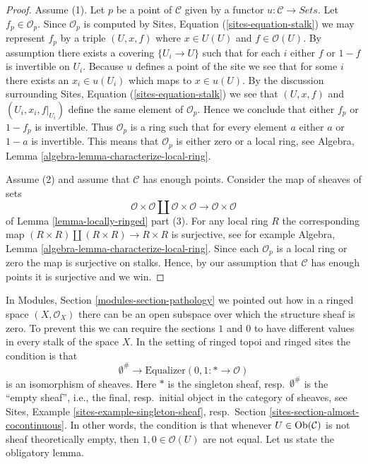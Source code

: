 \begin{proof}
Assume (1). Let $p$ be a point of $\mathcal{C}$ given by a functor
$u : \mathcal{C} \to \textit{Sets}$. Let
$f_p \in \mathcal{O}_p$. Since $\mathcal{O}_p$ is computed by
Sites, Equation (\ref{sites-equation-stalk})
we may represent $f_p$ by a triple
$(U, x, f)$ where $x \in U(U)$ and $f \in \mathcal{O}(U)$.
By assumption there exists a covering $\{U_i \to U\}$
such that for each $i$ either $f$ or $1 - f$ is invertible
on $U_i$. Because $u$ defines a point of the site we see that
for some $i$ there exists an $x_i \in u(U_i)$ which maps to
$x \in u(U)$. By the discussion surrounding
Sites, Equation (\ref{sites-equation-stalk})
we see that $(U, x, f)$ and $(U_i, x_i, f|_{U_i})$ define the
same element of $\mathcal{O}_p$. Hence we conclude that
either $f_p$ or $1 - f_p$ is invertible. Thus
$\mathcal{O}_p$ is a ring such that for every element $a$
either $a$ or $1 - a$ is invertible. This means that $\mathcal{O}_p$
is either zero or a local ring, see
Algebra, Lemma \ref{algebra-lemma-characterize-local-ring}.

\medskip\noindent
Assume (2) and assume that $\mathcal{C}$ has enough points.
Consider the map of sheaves of sets
$$
\mathcal{O} \times \mathcal{O} \amalg \mathcal{O} \times \mathcal{O}
\longrightarrow
\mathcal{O} \times \mathcal{O}
$$
of
Lemma \ref{lemma-locally-ringed} part (3). For any local ring $R$
the corresponding map
$(R \times R) \amalg (R \times R) \to R \times R$
is surjective, see for example
Algebra, Lemma \ref{algebra-lemma-characterize-local-ring}.
Since each $\mathcal{O}_p$ is a local ring or zero the map is
surjective on stalks. Hence, by our assumption that $\mathcal{C}$
has enough points it is surjective and we win.
\end{proof}

\noindent
In
Modules, Section \ref{modules-section-pathology}
we pointed out how in a ringed space $(X, \mathcal{O}_X)$
there can be an open subspace over which the structure sheaf is zero.
To prevent this we can require the sections $1$ and $0$ to have different
values in every stalk of the space $X$. In the setting of ringed topoi
and ringed sites the condition is that
\begin{equation}
\label{equation-one-is-never-zero}
\emptyset^\# \longrightarrow
\text{Equalizer}(0, 1 : * \longrightarrow \mathcal{O})
\end{equation}
is an isomorphism of sheaves. Here $*$ is the singleton sheaf,
resp.\ $\emptyset^\#$ is the ``empty sheaf'',
i.e., the final, resp.\ initial object in the category of sheaves, see
Sites, Example \ref{sites-example-singleton-sheaf},
resp.\ Section \ref{sites-section-almost-cocontinuous}.
In other words, the condition is that whenever $U \in \mathop{\rm Ob}\nolimits(\mathcal{C})$
is not sheaf theoretically empty, then $1, 0 \in \mathcal{O}(U)$ are not
equal. Let us state the obligatory lemma.

